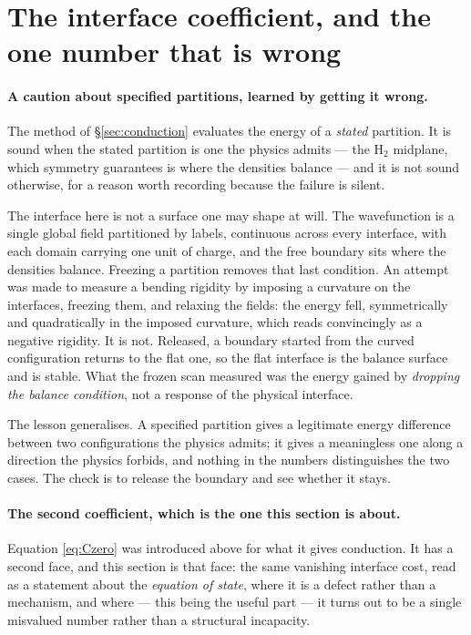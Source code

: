 \documentclass[11pt]{article}
\begin{document}
\section{The interface coefficient, and the one number that is wrong}\label{sec:coefficient}

\paragraph{A caution about specified partitions, learned by getting it wrong.} The method of
\S\ref{sec:conduction} evaluates the energy of a \emph{stated} partition. It is sound when the
stated partition is one the physics admits --- the $\mathrm{H}_2$ midplane, which symmetry
guarantees is where the densities balance --- and it is not sound otherwise, for a reason worth
recording because the failure is silent.

The interface here is not a surface one may shape at will. The wavefunction is a single global field
partitioned by labels, continuous across every interface, with each domain carrying one unit of
charge, and the free boundary sits where the densities balance. Freezing a partition removes that
last condition. An attempt was made to measure a bending rigidity by imposing a curvature on the
interfaces, freezing them, and relaxing the fields: the energy fell, symmetrically and quadratically
in the imposed curvature, which reads convincingly as a negative rigidity. It is not. Released, a
boundary started from the curved configuration returns to the flat one, so the flat interface is the
balance surface and is stable. What the frozen scan measured was the energy gained by \emph{dropping
the balance condition}, not a response of the physical interface.

The lesson generalises. A specified partition gives a legitimate energy difference between two
configurations the physics admits; it gives a meaningless one along a direction the physics
forbids, and nothing in the numbers distinguishes the two cases. The check is to release the
boundary and see whether it stays.

\paragraph{The second coefficient, which is the one this section is about.}

Equation \eqref{eq:Czero} was introduced above for what it gives conduction. It has a second face,
and this section is that face: the same vanishing interface cost, read as a statement about the
\emph{equation of state}, where it is a defect rather than a mechanism, and where --- this being the
useful part --- it turns out to be a single misvalued number rather than a structural incapacity.
\end{document}
